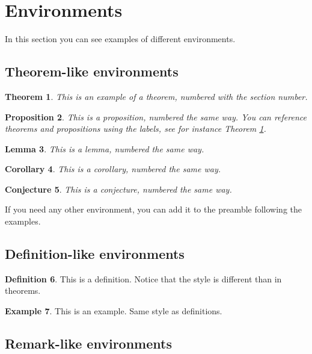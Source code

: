 \documentclass[12,twoside]{mammeTFM}
\newtheorem{theorem}{Theorem}[section]
\newtheorem{proposition}[theorem]{Proposition}
\newtheorem{lemma}[theorem]{Lemma}
\newtheorem{corollary}[theorem]{Corollary}
\newtheorem{conjecture}[theorem]{Conjecture}
\theoremstyle{definition}
\newtheorem{definition}[theorem]{Definition}
\newtheorem{example}[theorem]{Example}
\theoremstyle{remark}
\begin{document}
\section{Environments}

In this section you can see examples of different environments.

\subsection{Theorem-like environments}

\begin{theorem} \label{th:example}
This is an example of a theorem, numbered with the section number.
\end{theorem}

\begin{proposition}
This is a proposition, numbered the same way. You can reference theorems and propositions using the labels, see for instance Theorem \ref{th:example}.
\end{proposition}

\begin{lemma}
This is a lemma, numbered the same way.
\end{lemma}

\begin{corollary}
This is a corollary, numbered the same way.
\end{corollary}

\begin{conjecture}
This is a conjecture, numbered the same way.
\end{conjecture}

If you need any other environment, you can add it to the preamble following the examples.

\subsection{Definition-like environments}

\begin{definition}
This is a definition. Notice that the style is different than in theorems.
\end{definition}

\begin{example}
This is an example. Same style as definitions.
\end{example}

\subsection{Remark-like environments}
\end{document}
